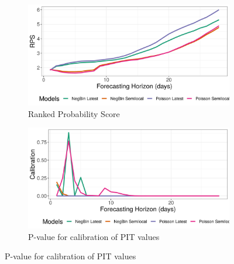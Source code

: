 \documentclass[12pt]{article}
\begin{document}
\begin{figure}[h!]
\begin{subfigure}{0.5\textwidth}
  \centering
  \includegraphics[width=\linewidth]{../output/national_crps.png}  
  \caption{Ranked Probability Score}
  \label{fig:sub-first}
\end{subfigure}
\begin{subfigure}{0.5\textwidth}
  \centering
  \includegraphics[width=\linewidth]{../output/national_calibration.png}  
  \caption{P-value for calibration of PIT values}
  \label{fig:sub-second}
\end{subfigure}


\end{figure}
\end{document}
